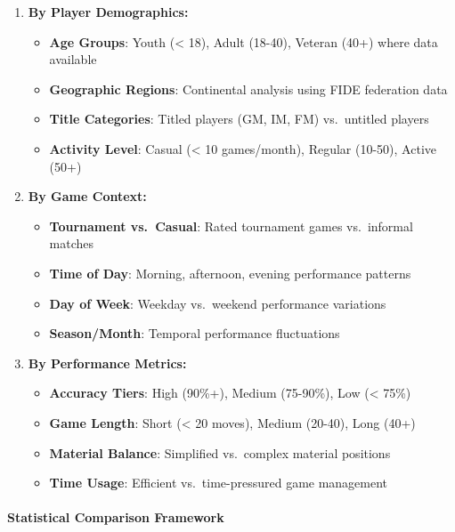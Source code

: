 \documentclass[
]{article}
\providecommand{\tightlist}{%
  \setlength{\itemsep}{0pt}\setlength{\parskip}{0pt}}
\begin{document}
\begin{enumerate}
\def\labelenumi{\arabic{enumi}.}
\setcounter{enumi}{4}
\tightlist
\item
  \textbf{By Player Demographics:}

  \begin{itemize}
  \tightlist
  \item
    \textbf{Age Groups}: Youth (\textless{} 18), Adult (18-40), Veteran
    (40+) where data available
  \item
    \textbf{Geographic Regions}: Continental analysis using FIDE
    federation data
  \item
    \textbf{Title Categories}: Titled players (GM, IM, FM) vs.~untitled
    players
  \item
    \textbf{Activity Level}: Casual (\textless{} 10 games/month),
    Regular (10-50), Active (50+)
  \end{itemize}
\item
  \textbf{By Game Context:}

  \begin{itemize}
  \tightlist
  \item
    \textbf{Tournament vs.~Casual}: Rated tournament games vs.~informal
    matches
  \item
    \textbf{Time of Day}: Morning, afternoon, evening performance
    patterns
  \item
    \textbf{Day of Week}: Weekday vs.~weekend performance variations
  \item
    \textbf{Season/Month}: Temporal performance fluctuations
  \end{itemize}
\item
  \textbf{By Performance Metrics:}

  \begin{itemize}
  \tightlist
  \item
    \textbf{Accuracy Tiers}: High (90\%+), Medium (75-90\%), Low
    (\textless{} 75\%)
  \item
    \textbf{Game Length}: Short (\textless{} 20 moves), Medium (20-40),
    Long (40+)
  \item
    \textbf{Material Balance}: Simplified vs.~complex material positions
  \item
    \textbf{Time Usage}: Efficient vs.~time-pressured game management
  \end{itemize}
\end{enumerate}

\paragraph{Statistical Comparison
Framework}\label{statistical-comparison-framework}
\end{document}
